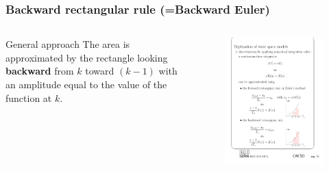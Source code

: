 \begin{frame}
	\frametitle{Backward rectangular rule (=Backward Euler)}
\begin{columns}
	\begin{column}{0.5\textwidth}
	\begin{block}{General approach}
		The area is approximated by the rectangle looking \textbf{backward} from $k$ toward $(k-1)$ with an amplitude equal to the value of the function at $k$. 
	\end{block}	
	\end{column}
		
	\begin{column}{0.5\textwidth}
		\begin{figure}
			\centering
			\includegraphics[width=1\linewidth]{B_euler}
		\end{figure}
	\end{column}
\end{columns}
\end{frame}

